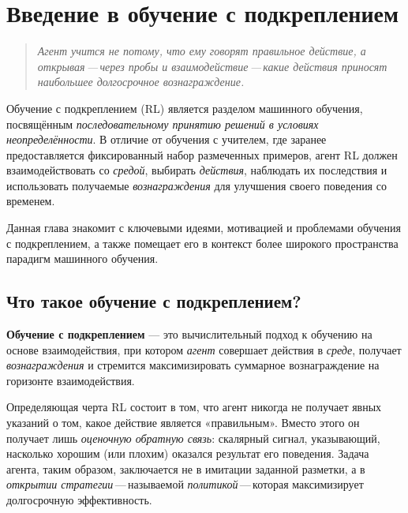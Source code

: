 \chapter[Введение в RL]{Введение в обучение с подкреплением}
\label{ch:intro}

\begin{quote}
\itshape
Агент учится не потому, что ему говорят правильное действие, а открывая\,---\,через пробы и взаимодействие\,---\,какие действия приносят наибольшее долгосрочное вознаграждение.
\end{quote}

\bigskip

Обучение с подкреплением (RL) является разделом машинного обучения, посвящённым \emph{последовательному принятию решений в условиях неопределённости}.  В отличие от обучения с учителем, где заранее предоставляется фиксированный набор размеченных примеров, агент RL должен взаимодействовать со \emph{средой}, выбирать \emph{действия}, наблюдать их последствия и использовать получаемые \emph{вознаграждения} для улучшения своего поведения со временем.

Данная глава знакомит с ключевыми идеями, мотивацией и проблемами обучения с подкреплением, а также помещает его в контекст более широкого пространства парадигм машинного обучения.


\section{Что такое обучение с подкреплением?}
\label{sec:what-is-rl}

\begin{definition}
\label{def:rl}
\textbf{Обучение с подкреплением} — это вычислительный подход к обучению на основе взаимодействия, при котором \emph{агент} совершает действия в \emph{среде}, получает \emph{вознаграждения} и стремится максимизировать суммарное вознаграждение на горизонте взаимодействия.
\end{definition}

Определяющая черта RL состоит в том, что агент никогда не получает явных указаний о том, какое действие является «правильным».  Вместо этого он получает лишь \emph{оценочную обратную связь}: скалярный сигнал, указывающий, насколько хорошим (или плохим) оказался результат его поведения.  Задача агента, таким образом, заключается не в имитации заданной разметки, а в \emph{открытии стратегии}\,---\,называемой \emph{политикой}\,---\,которая максимизирует долгосрочную эффективность.

